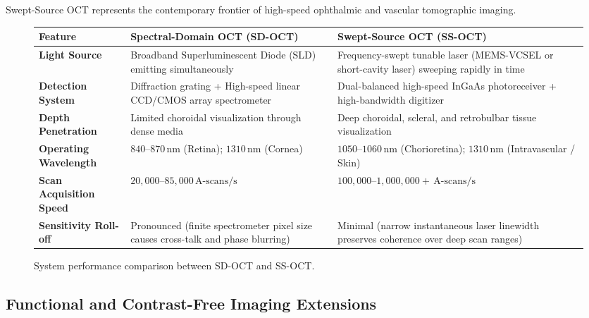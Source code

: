 \documentclass[11pt,a4paper]{article}
\begin{document}
Swept-Source OCT represents the contemporary frontier of high-speed ophthalmic and vascular tomographic imaging.

\begin{figure}[htbp]
\centering
\begin{tabular}{p{3.5cm}p{5.5cm}p{5.5cm}}
\toprule
\textbf{Feature} & \textbf{Spectral-Domain OCT (SD-OCT)} & \textbf{Swept-Source OCT (SS-OCT)} \\
\midrule
\textbf{Light Source} & Broadband Superluminescent Diode (SLD) emitting simultaneously & Frequency-swept tunable laser (MEMS-VCSEL or short-cavity laser) sweeping rapidly in time \\
\addlinespace
\textbf{Detection System} & Diffraction grating + High-speed linear CCD/CMOS array spectrometer & Dual-balanced high-speed InGaAs photoreceiver + high-bandwidth digitizer \\
\addlinespace
\textbf{Depth Penetration} & Limited choroidal visualization through dense media & Deep choroidal, scleral, and retrobulbar tissue visualization \\
\addlinespace
\textbf{Operating Wavelength} & $840\text{--}870\,\text{nm}$ (Retina); $1310\,\text{nm}$ (Cornea) & $1050\text{--}1060\,\text{nm}$ (Chorioretina); $1310\,\text{nm}$ (Intravascular / Skin) \\
\addlinespace
\textbf{Scan Acquisition Speed} & $20,000\text{--}85,000\,\text{A-scans/s}$ & $100,000\text{--}1,000,000+\,\text{A-scans/s}$ \\
\addlinespace
\textbf{Sensitivity Roll-off} & Pronounced (finite spectrometer pixel size causes cross-talk and phase blurring) & Minimal (narrow instantaneous laser linewidth preserves coherence over deep scan ranges) \\
\bottomrule
\end{tabular}
\caption{System performance comparison between SD-OCT and SS-OCT.}
\label{tab:sdoct_vs_ssoct}
\end{figure}

\subsection{Functional and Contrast-Free Imaging Extensions}
\end{document}
